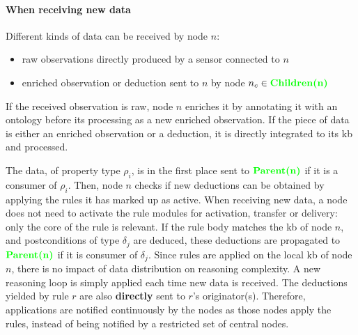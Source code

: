 \documentclass{iosart2c}
\newcommand{\added}[1]{\textcolor{green}{\textbf{#1}}}
\begin{document}
\paragraph{When receiving new data}

Different kinds of data can be received by node $n$:
\begin{itemize}
	\item raw observations directly produced by a sensor connected to $n$
	\item enriched observation or deduction sent to $n$ by node $n_c \in \added{Children(n)}$
\end{itemize}
If the received observation is raw, node $n$ enriches it by annotating it with an ontology before its processing as a new enriched observation. 
If the piece of data is either an enriched observation or a deduction, it is directly integrated to its \gls{kb} and processed. 

The data, of property type $\rho_{i}$, is in the first place sent to $\added{Parent(n)}$ if it is a consumer of $\rho_{i}$. 
Then, node $n$ checks if new deductions can be obtained by applying the rules it has marked up as active.
When receiving new data, a node does not need to activate the rule modules for activation, transfer or delivery: only the core of the rule is relevant.
If the rule body matches the \gls{kb} of node $n$, and postconditions of type $\delta_{j}$ are deduced, these deductions are propagated to $\added{Parent(n)}$ if it is consumer of $\delta_{j}$.
Since rules are applied on the local \gls{kb} of node $n$, there is no impact of data distribution on reasoning complexity. 
A new reasoning loop is simply applied each time new data is received.
The deductions yielded by rule $r$ are also \textbf{directly} sent to $r$'s originator(s).
Therefore, applications are notified continuously by the nodes as those nodes apply the rules, instead of being notified by a restricted set of central nodes.

%	
\end{document}
